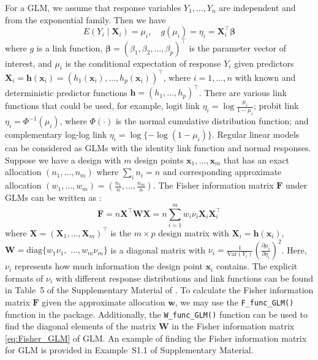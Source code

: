 For a GLM, we assume that response variables $Y_1, \dots, Y_n$ are independent and from the exponential family. Then we have \citep{dobson2018, pmcc1989}
$$E(Y_i \mid \mathbf X_i) = \mu_i,\quad g(\mu_i)=\eta_i=\mathbf X_i^\top \boldsymbol \beta$$
where $g$ is a link function, $\boldsymbol \beta = (\beta_1, \beta_2,\dots, \beta_p)^\top$ is the parameter vector of interest, and $\mu_i$ is the conditional expectation of response $Y_i$ given predictors $\mathbf X_i = \mathbf h(\mathbf x_i) = (h_1(\mathbf x_i),\dots, h_p(\mathbf x_i))^\top$, where $i = 1, \dots, n$ with known and deterministic predictor functions $\mathbf h = (h_1, \dots, h_p)^\top$. There are various link functions that could be used, for example, logit link $\eta_i = \log\frac{\mu_i}{1-\mu_i}$; probit link $\eta_i = \Phi^{-1}(\mu_i)$, where $\Phi(\cdot)$ is the normal cumulative distribution function; and complementary log-log link $\eta_i = \log\{-\log(1-\mu_i)\}$. Regular linear models can be considered as GLMs with the identity link function and normal responses. Suppose we have a design with $m$ design points $\mathbf x_1, \dots, \mathbf x_m$ that has an exact allocation $(n_1,\dots,n_m)$ where $\sum_i n_i = n$ and corresponding approximate allocation $(w_1,\dots,w_m)=(\frac{n_1}{n},\dots,\frac{n_m}{n})$. The Fisher information matrix $\mathbf F$ under GLMs can be written as \citep{pmcc1989, khuri2006,stufken2012,ymm2016}:
\begin{equation}\label{eq:Fisher_GLM}
  \mathbf F = n \mathbf X^\top \mathbf W \mathbf X = n\sum_{i=1}^m w_i \nu_i {\mathbf X}_i{\mathbf X}_i^\top
\end{equation}
where $\mathbf X = (\mathbf X_1, \dots, \mathbf X_m)^\top$ is the $m\times p$ design matrix with $\mathbf X_i = \mathbf h(\mathbf x_i)$, $\mathbf W = \text{diag}\{w_1\nu_1,$ $\dots, w_m\nu_m\}$ is a diagonal matrix with $\nu_i = \frac{1}{\text{Var}(Y_i)} (\frac{\partial \mu_i}{\partial \eta_i})^2$. Here, $\nu_i$ represents how much information the design point $\mathbf x_i$ contains. The explicit formats of $\nu_i$ with different response distributions and link functions can be found in Table~5 of the Supplementary Material of \cite{huang2023constrained}. To calculate the Fisher information matrix $\mathbf{F}$ given the approximate allocation $\mathbf{w}$, we may use the \texttt{F\_func\_GLM()} function in the  package. Additionally, the \texttt{W\_func\_GLM()} function can be used to find the diagonal elements of the matrix $\mathbf{W}$ in the Fisher information matrix \eqref{eq:Fisher_GLM} of GLM. An example of finding the Fisher information matrix for GLM is provided in Example~S1.1 of Supplementary Material.

